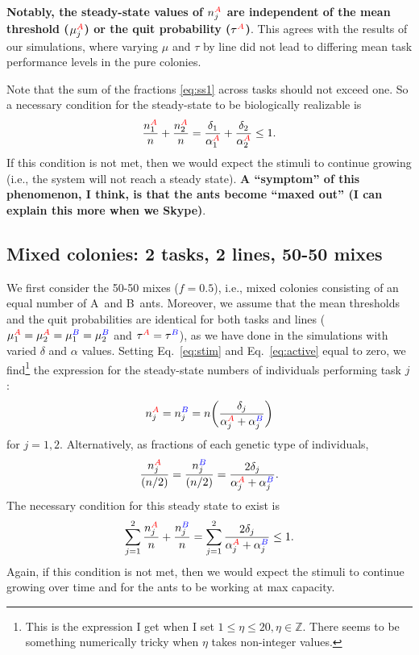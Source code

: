 \documentclass[10pt]{article}
\theoremstyle{remark}
\newcommand{\ZZ}{\mathbb{Z}}
\newcommand{\A}{{\color{red}A}}
\newcommand{\B}{{\color{blue}B}}
\begin{document}
\textbf{Notably, the steady-state values of $n_j^{\A}$ are \textbf{independent} of the mean threshold ($\mu_j^{\A}$) or the quit probability ($\tau^{\A}$)}. This agrees with the results of our simulations, where varying $\mu$ and $\tau$ by line did not lead to differing mean task performance levels in the pure colonies.

Note that the sum of the fractions \eqref{eq:ss1} across tasks should not exceed one. So a necessary condition for the steady-state to be biologically realizable is 
\begin{equation}
    \frac{n_1^{\A}}{n} + \frac{n_2^{\A}}{n} = \frac{\delta_1}{\alpha_1^{\A}} + \frac{\delta_2}{\alpha_2^{\A} }\leq 1 \label{eq:cond1}.
\end{equation}
If this condition is not met, then we would expect the stimuli to continue growing (i.e., the system will not reach a steady state). \textbf{A ``symptom'' of this phenomenon, I think, is that the ants become ``maxed out'' (I can explain this more when we Skype)}.

\subsection{Mixed colonies: 2 tasks, 2 lines, 50-50 mixes} \label{sec:5050}

{\color{black}We first consider the 50-50 mixes ($f=0.5$), i.e., mixed colonies consisting of an equal number of \A\ and \B\ ants.}
Moreover, we assume that the mean thresholds and the quit probabilities are identical for both tasks and lines ($\mu_1^{\A} = \mu_2^{\A} = \mu_1^{\B} = \mu_2^{\B}$ and $\tau^{\A} = \tau^{\B}$), as we have done in the simulations with varied $\delta$ and $\alpha$ values. Setting Eq.~\eqref{eq:stim} and Eq.~\eqref{eq:active} equal to zero, we find\footnote{This is the expression I get when I set $1\leq \eta \leq 20, \eta \in \ZZ$. There seems to be something numerically tricky when $\eta$ takes non-integer values.} the expression for the steady-state numbers of individuals performing task $j$:%
\begin{equation}
     n_j^{\A} =  n_j^{\B} = n\bigg(\frac{\delta_j}{\alpha_j^{\A} + \alpha_j^{\B}}\bigg) \label{eq:ss2a}
\end{equation}
for $j = 1, 2$.
Alternatively, as fractions of each genetic type of individuals,
\begin{equation}
     \frac{n_j^{\A}}{(n/2)} =  \frac{n_j^{\B}}{(n/2)} = \frac{2\delta_j}{\alpha_j^{\A} + \alpha_j^{\B}}. \label{eq:ss2}
\end{equation}
The necessary condition for this steady state to exist is
\begin{equation}
     \sum_{j=1}^2 \frac{n_j^{\A}}{n} + \frac{n_j^{\B}}{n} 
     = \sum_{j=1}^2 \frac{2\delta_j}{\alpha_j^{\A} + \alpha_j^{\B}}
     \leq 1.
     \label{eq:cond2}
\end{equation}
Again, if this condition is not met, then we would expect the stimuli to continue growing over time and for the ants to be working at max capacity.
\end{document}
